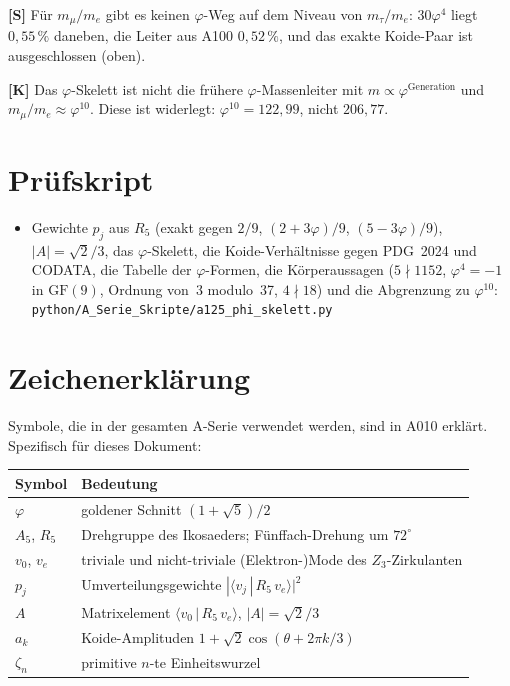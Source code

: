 \textbf{[S]} Für $m_\mu/m_e$ gibt es keinen $\varphi$-Weg auf dem Niveau von
$m_\tau/m_e$: $30\varphi^4$ liegt $0{,}55\,\%$ daneben, die Leiter aus A100
$0{,}52\,\%$, und das exakte Koide-Paar ist ausgeschlossen (oben).

\textbf{[K]} Das $\varphi$-Skelett ist nicht die frühere $\varphi$-Massenleiter
mit $m\propto\varphi^{\text{Generation}}$ und $m_\mu/m_e\approx\varphi^{10}$.
Diese ist widerlegt: $\varphi^{10}=122{,}99$, nicht $206{,}77$.

\section{Prüfskript}

\begin{itemize}
  \item Gewichte $p_j$ aus $R_5$ (exakt gegen $2/9$, $(2+3\varphi)/9$,
    $(5-3\varphi)/9$), $|A|=\sqrt2/3$, das $\varphi$-Skelett, die
    Koide-Verhältnisse gegen PDG~2024 und CODATA, die Tabelle der
    $\varphi$-Formen, die Körperaussagen ($5\nmid1152$, $\varphi^4=-1$ in
    $\mathrm{GF}(9)$, Ordnung von~3 modulo~37, $4\nmid18$) und die Abgrenzung
    zu $\varphi^{10}$:
    \texttt{python/A\_Serie\_Skripte/a125\_phi\_skelett.py}
\end{itemize}

\section{Zeichenerklärung}

Symbole, die in der gesamten A-Serie verwendet werden, sind in A010 erklärt.
Spezifisch für dieses Dokument:

\begin{center}
\renewcommand{\arraystretch}{1.3}
{\small\begin{tabular}{lp{9cm}}
\toprule
Symbol & Bedeutung \\
\midrule
$\varphi$ & goldener Schnitt $(1+\sqrt5)/2$ \\
$A_5$, $R_5$ & Drehgruppe des Ikosaeders; Fünffach-Drehung um $72^\circ$ \\
$v_0$, $v_e$ & triviale und nicht-triviale (Elektron-)Mode des $Z_3$-Zirkulanten \\
$p_j$ & Umverteilungsgewichte $|\langle v_j\,|\,R_5\,v_e\rangle|^2$ \\
$A$ & Matrixelement $\langle v_0\,|\,R_5\,v_e\rangle$, $|A|=\sqrt2/3$ \\
$a_k$ & Koide-Amplituden $1+\sqrt2\cos(\theta+2\pi k/3)$ \\
$\zeta_n$ & primitive $n$-te Einheitswurzel \\
\bottomrule
\end{tabular}}
\renewcommand{\arraystretch}{1.0}
\end{center}

